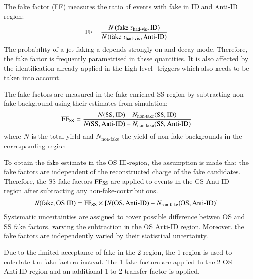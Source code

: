 


The fake factor (FF) measures the ratio of events with fake \tauhadvis in ID and
Anti-ID region:
\begin{align*}
  \text{FF} = \frac{N\left( \text{fake} \, \tau_{\text{had-vis}}, \text{ID} \right)}{N\left( \text{fake} \, \tau_{\text{had-vis}}, \text{Anti-ID} \right)}
\end{align*}
The probability of a jet faking a \tauhadvis depends strongly on \tauhadvis \pT
and decay mode. Therefore, the fake factor is frequently parametrised in these
quantities. It is also affected by the \tauhadvis identification already applied
in the high-level \tauhadvis-triggers which also needs to be taken into account.

The fake factors are measured in the fake enriched SS-region by subtracting
non-fake-\tauhadvis background using their estimates from simulation:
\begin{align*}
  \text{FF}_\text{SS} = \frac{N(\text{SS}, \text{ID}) - N_\text{non-fake}(\text{SS}, \text{ID})}{N(\text{SS}, \text{Anti-ID}) - N_\text{non-fake}(\text{SS}, \text{Anti-ID})}
\end{align*}
where $N$ is the total yield and $N_\text{non-fake}$ the yield of
non-fake-\tauhadvis backgrounds in the corresponding region.

To obtain the fake \tauhadvis estimate in the OS ID-region, the assumption is
made that the fake factors are independent of the reconstructed charge of the
fake \tauhadvis candidates. Therefore, the SS fake factors $\text{FF}_\text{SS}$ are
applied to events in the OS Anti-ID region after subtracting any
non-fake-\tauhadvis contributions.
\begin{align*}
  N(\text{fake}, \text{OS ID}) = \text{FF}_\text{SS} \times \left[ N(\text{OS}, \text{Anti-ID}) - N_\text{non-fake}(\text{OS}, \text{Anti-ID}) \right]
\end{align*}
Systematic uncertainties are assigned to
cover possible difference betwen OS and SS fake factors, varying the
subtraction in the OS Anti-ID region. Moreover, the fake factors are
independently varied by their statistical uncertainty.

Due to the limited acceptance of fake \tauhadvis in the 2 \btag region, the 1
\btag region is used to calculate the fake factors instead. The 1 \btag fake
factors are applied to the 2 \btag OS Anti-ID region and an additional 1 to 2
\btag transfer factor is applied.

